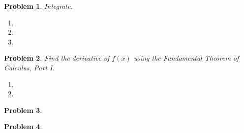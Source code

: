 \documentclass[12pt]{article}
\newtheorem{problem}{Problem}
\renewcommand{\fcProblemRef}{\theproblem.\theenumi}
\begin{document}
\begin{problem}
Integrate.
\begin{enumerate}[ref={\fcProblemRef}]
\item 
\item  
\item 
\end{enumerate}
\end{problem}



\begin{problem}
Find the  derivative of $f(x)$ using the Fundamental Theorem of Calculus, Part I.
\begin{enumerate}[ref={\fcProblemRef}]
\item 
\item 

\end{enumerate}
\end{problem}


\begin{problem}~

\end{problem}


\begin{problem}

\end{problem}

\end{document}

